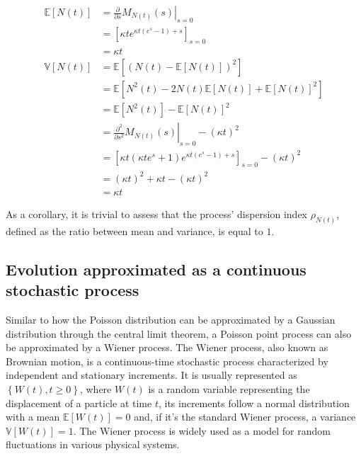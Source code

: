 \documentclass{./LatexTemplate/svproc}
\begin{document}
\begin{align}
    \mathbb{E}\left[N(t)\right] &= \left.\frac{\partial}{\partial s}M_{N(t)}(s)\right|_{s=0}\\
    &= \left[\kappa t e^{\kappa t\left(e^s-1\right) + s}\right]_{s=0}\nonumber\\
    &= \kappa t\\
    \mathbb{V}\left[N(t)\right] &= \mathbb{E}\left[\left(N(t) - \mathbb{E}\left[N(t)\right]\right)^2\right]\\
    &= \mathbb{E}\left[N^2(t) -2N(t)\mathbb{E}\left[N(t)\right] + \mathbb{E}\left[N(t)\right]^2\right]\nonumber\\
    &= \mathbb{E}\left[N^2(t)\right] -\mathbb{E}\left[N(t)\right]^2\nonumber\\
    &= \left.\frac{\partial^2}{\partial s^2}M_{N(t)}(s)\right|_{s=0} - \left(\kappa t\right)^2\nonumber\\
    &= \left[\kappa t \left(\kappa t e^s + 1\right)e^{\kappa t\left(e^s - 1\right) + s}\right]_{s=0} - \left(\kappa t\right)^2\nonumber\\
    &= \left(\kappa t\right)^2 + \kappa t - \left(\kappa t\right)^2\nonumber\\
    &= \kappa t
\end{align}

As a corollary, it is trivial to assess that the process' dispersion index $\rho_{N(t)}$, defined as the ratio between mean and variance, is equal to $1$.

%
\subsection{Evolution approximated as a continuous stochastic process}
%

Similar to how the Poisson distribution can be approximated by a Gaussian distribution through the central limit theorem, a Poisson point process can also be approximated by a Wiener process. The Wiener process, also known as Brownian motion, is a continuous-time stochastic process characterized by independent and stationary increments. It is usually represented as $\left\{W(t), t \geq 0\right\}$, where $W(t)$ is a random variable representing the displacement of a particle at time $t$, its increments follow a normal distribution with a mean $\mathbb{E}[W(t)] = 0$ and, if it's the standard Wiener process, a variance $\mathbb{V}[W(t)] = 1$. The Wiener process is widely used as a model for random fluctuations in various physical systems.
\end{document}
